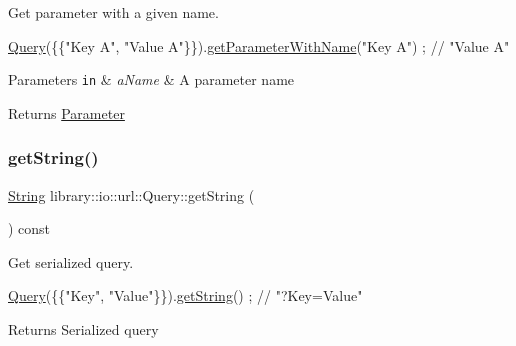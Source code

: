 Get parameter with a given name. 


\begin{DoxyCode}
\hyperlink{classlibrary_1_1io_1_1url_1_1_query_a6781de8f7b7251f8e17c191434b08039}{Query}(\{\{\textcolor{stringliteral}{"Key A"}, \textcolor{stringliteral}{"Value A"}\}\}).\hyperlink{classlibrary_1_1io_1_1url_1_1_query_a5d279ba3f21372fb4768d32a74492b85}{getParameterWithName}(\textcolor{stringliteral}{"Key A"}) ; \textcolor{comment}{// "Value A"}
\end{DoxyCode}



\begin{DoxyParams}[1]{Parameters}
\mbox{\tt in}  & {\em a\+Name} & A parameter name \\
\hline
\end{DoxyParams}
\begin{DoxyReturn}{Returns}
\hyperlink{classlibrary_1_1io_1_1url_1_1_query_1_1_parameter}{Parameter} 
\end{DoxyReturn}
\mbox{\label{classlibrary_1_1io_1_1url_1_1_query_a64def65d3297fd007265f23f49c8d27b}} 
\subsubsection{\texorpdfstring{get\+String()}{getString()}}
{\footnotesize\ttfamily \hyperlink{namespacelibrary_1_1io_a7469b45835a4421045db344d6a5a1f85}{String} library\+::io\+::url\+::\+Query\+::get\+String (\begin{DoxyParamCaption}{ }\end{DoxyParamCaption}) const}



Get serialized query. 


\begin{DoxyCode}
\hyperlink{classlibrary_1_1io_1_1url_1_1_query_a6781de8f7b7251f8e17c191434b08039}{Query}(\{\{\textcolor{stringliteral}{"Key"}, \textcolor{stringliteral}{"Value"}\}\}).\hyperlink{classlibrary_1_1io_1_1url_1_1_query_a64def65d3297fd007265f23f49c8d27b}{getString}() ; \textcolor{comment}{// "?Key=Value"}
\end{DoxyCode}


\begin{DoxyReturn}{Returns}
Serialized query 
\end{DoxyReturn}
\mbox{\label{classlibrary_1_1io_1_1url_1_1_query_a19b51e7e6dca5e76284ddf5b62dd4f7f}} 

